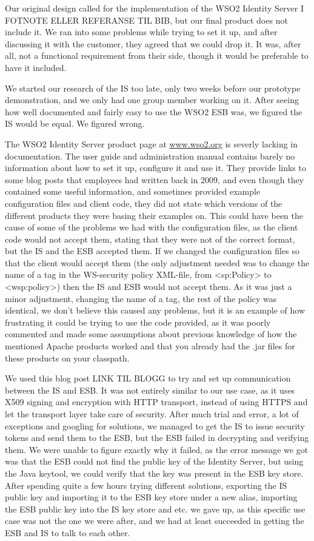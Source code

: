 Our original design called for the implementation of the WSO2 Identity Server \LINK I FOTNOTE ELLER REFERANSE TIL BIB, but our final product does not include it. We ran into some problems while trying to set it up, and after discussing it with the customer, they agreed that we could drop it. It was, after all, not a functional requirement from their side, though it would be preferable to have it included. 

We started our research of the IS too late, only two weeks before our prototype demonstration, and we only had one group member working on it. After seeing how well documented and fairly easy to use the WSO2 ESB was, we figured the IS would be equal. We figured wrong. 

The WSO2 Identity Server product page at \url{www.wso2.org} is severly lacking in documentation. The user guide and administration manual contains barely no information about how to set it up, configure it and use it. They provide links to some blog posts that employees had written back in 2009, and even though they contained some useful information, and sometimes provided example configuration files and client code, they did not state which versions of the different products they were basing their examples on. This could have been the cause of some of the problems we had with the configuration files, as the client code would not accept them, stating that they were not of the correct format, but the IS and the ESB accepted them. If we changed the configuration files so that the client would accept them (the only adjustment needed was to change the name of a tag in the WS-security policy XML-file, from <sp:Policy> to <wsp:policy>) then the IS and ESB would not accept them. As it was just a minor adjustment, changing the name of a tag, the rest of the policy was identical, we don't believe this caused any problems, but it is an example of how frustrating it could be trying to use the code provided, as it was poorly commented and made some assumptions about previous knowledge of how the mentioned Apache products worked and that you already had the .jar files for these products on your classpath. 


We used this blog post LINK TIL BLOGG to try and set up communication between the IS and ESB. It was not entirely similar to our use case, as it uses X509 signing and encryption with HTTP transport, instead of using HTTPS and let the transport layer take care of security. After much trial and error, a lot of exceptions and googling for solutions, we managed to get the IS to issue security tokens and send them to the ESB, but the ESB failed in decrypting and verifying them. We were unable to figure exactly why it failed, as the error message we got was that the ESB could not find the public key of the Identity Server, but using the Java keytool, we could verify that the key was present in the ESB key store. After spending quite a few hours trying different solutions, exporting the IS public key and importing it to the ESB key store under a new alias, importing the ESB public key into the IS key store and etc. we gave up, as this specific use case was not the one we were after, and we had at least succeeded in getting the ESB and IS to talk to each other. 

